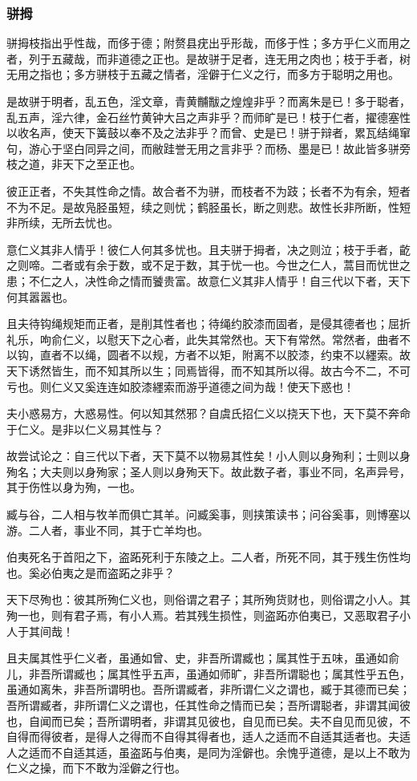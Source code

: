 \documentclass[]{article}
\begin{document}
\hypertarget{header-n182}{%
\subsubsection{骈拇}\label{header-n182}}

骈拇枝指出乎性哉，而侈于德；附赘县疣出乎形哉，而侈于性；多方乎仁义而用之者，列于五藏哉，而非道德之正也。是故骈于足者，连无用之肉也；枝于手者，树无用之指也；多方骈枝于五藏之情者，淫僻于仁义之行，而多方于聪明之用也。

是故骈于明者，乱五色，淫文章，青黄黼黻之煌煌非乎？而离朱是已！多于聪者，乱五声，淫六律，金石丝竹黄钟大吕之声非乎？而师旷是已！枝于仁者，擢德塞性以收名声，使天下簧鼓以奉不及之法非乎？而曾、史是已！骈于辩者，累瓦结绳窜句，游心于坚白同异之间，而敝跬誉无用之言非乎？而杨、墨是已！故此皆多骈旁枝之道，非天下之至正也。

彼正正者，不失其性命之情。故合者不为骈，而枝者不为跂；长者不为有余，短者不为不足。是故凫胫虽短，续之则忧；鹤胫虽长，断之则悲。故性长非所断，性短非所续，无所去忧也。

意仁义其非人情乎！彼仁人何其多忧也。且夫骈于拇者，决之则泣；枝于手者，齕之则啼。二者或有余于数，或不足于数，其于忧一也。今世之仁人，蒿目而忧世之患；不仁之人，决性命之情而饕贵富。故意仁义其非人情乎！自三代以下者，天下何其嚣嚣也。

且夫待钩绳规矩而正者，是削其性者也；待绳约胶漆而固者，是侵其德者也；屈折礼乐，呴俞仁义，以慰天下之心者，此失其常然也。天下有常然。常然者，曲者不以钩，直者不以绳，圆者不以规，方者不以矩，附离不以胶漆，约束不以纆索。故天下诱然皆生，而不知其所以生；同焉皆得，而不知其所以得。故古今不二，不可亏也。则仁义又奚连连如胶漆纆索而游乎道德之间为哉！使天下惑也！

夫小惑易方，大惑易性。何以知其然邪？自虞氏招仁义以挠天下也，天下莫不奔命于仁义。是非以仁义易其性与？

故尝试论之：自三代以下者，天下莫不以物易其性矣！小人则以身殉利；士则以身殉名；大夫则以身殉家；圣人则以身殉天下。故此数子者，事业不同，名声异号，其于伤性以身为殉，一也。

臧与谷，二人相与牧羊而俱亡其羊。问臧奚事，则挟策读书；问谷奚事，则博塞以游。二人者，事业不同，其于亡羊均也。

伯夷死名于首阳之下，盗跖死利于东陵之上。二人者，所死不同，其于残生伤性均也。奚必伯夷之是而盗跖之非乎？

天下尽殉也：彼其所殉仁义也，则俗谓之君子；其所殉货财也，则俗谓之小人。其殉一也，则有君子焉，有小人焉。若其残生损性，则盗跖亦伯夷已，又恶取君子小人于其间哉！

且夫属其性乎仁义者，虽通如曾、史，非吾所谓臧也；属其性于五味，虽通如俞儿，非吾所谓臧也；属其性乎五声，虽通如师旷，非吾所谓聪也；属其性乎五色，虽通如离朱，非吾所谓明也。吾所谓臧者，非所谓仁义之谓也，臧于其德而已矣；吾所谓臧者，非所谓仁义之谓也，任其性命之情而已矣；吾所谓聪者，非谓其闻彼也，自闻而已矣；吾所谓明者，非谓其见彼也，自见而已矣。夫不自见而见彼，不自得而得彼者，是得人之得而不自得其得者也，适人之适而不自适其适者也。夫适人之适而不自适其适，虽盗跖与伯夷，是同为淫僻也。余愧乎道德，是以上不敢为仁义之操，而下不敢为淫僻之行也。
\end{document}

